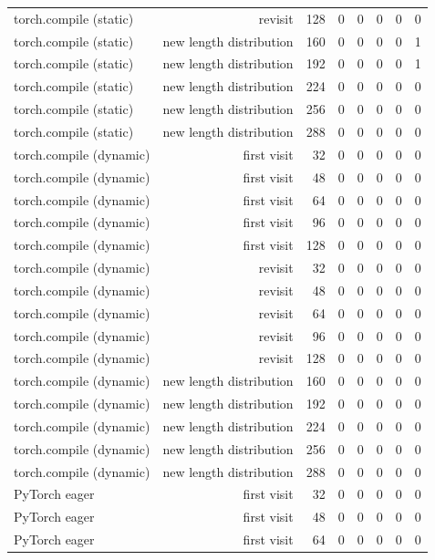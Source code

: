 \begin{tabular}{lrrrrrrr}
torch.compile (static) & revisit & 128 & 0 & 0 & 0 & 0 & 0 \\
torch.compile (static) & new length distribution & 160 & 0 & 0 & 0 & 0 & 1 \\
torch.compile (static) & new length distribution & 192 & 0 & 0 & 0 & 0 & 1 \\
torch.compile (static) & new length distribution & 224 & 0 & 0 & 0 & 0 & 0 \\
torch.compile (static) & new length distribution & 256 & 0 & 0 & 0 & 0 & 0 \\
torch.compile (static) & new length distribution & 288 & 0 & 0 & 0 & 0 & 0 \\
torch.compile (dynamic) & first visit & 32 & 0 & 0 & 0 & 0 & 0 \\
torch.compile (dynamic) & first visit & 48 & 0 & 0 & 0 & 0 & 0 \\
torch.compile (dynamic) & first visit & 64 & 0 & 0 & 0 & 0 & 0 \\
torch.compile (dynamic) & first visit & 96 & 0 & 0 & 0 & 0 & 0 \\
torch.compile (dynamic) & first visit & 128 & 0 & 0 & 0 & 0 & 0 \\
torch.compile (dynamic) & revisit & 32 & 0 & 0 & 0 & 0 & 0 \\
torch.compile (dynamic) & revisit & 48 & 0 & 0 & 0 & 0 & 0 \\
torch.compile (dynamic) & revisit & 64 & 0 & 0 & 0 & 0 & 0 \\
torch.compile (dynamic) & revisit & 96 & 0 & 0 & 0 & 0 & 0 \\
torch.compile (dynamic) & revisit & 128 & 0 & 0 & 0 & 0 & 0 \\
torch.compile (dynamic) & new length distribution & 160 & 0 & 0 & 0 & 0 & 0 \\
torch.compile (dynamic) & new length distribution & 192 & 0 & 0 & 0 & 0 & 0 \\
torch.compile (dynamic) & new length distribution & 224 & 0 & 0 & 0 & 0 & 0 \\
torch.compile (dynamic) & new length distribution & 256 & 0 & 0 & 0 & 0 & 0 \\
torch.compile (dynamic) & new length distribution & 288 & 0 & 0 & 0 & 0 & 0 \\
PyTorch eager & first visit & 32 & 0 & 0 & 0 & 0 & 0 \\
PyTorch eager & first visit & 48 & 0 & 0 & 0 & 0 & 0 \\
PyTorch eager & first visit & 64 & 0 & 0 & 0 & 0 & 0 \\

\end{tabular}
